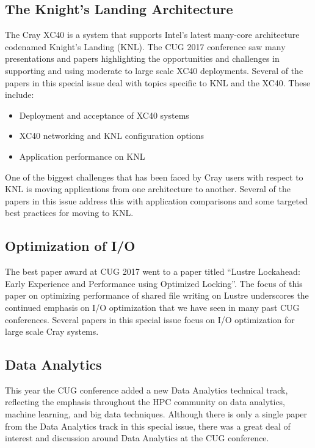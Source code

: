 \documentclass[AMA,LATO1COL,demo]{WileyNJD-v2}
\begin{document}
\subsection{The Knight's Landing Architecture}\label{sec:knl}

The Cray XC40 is a system that supports Intel's latest many-core architecture codenamed
Knight's Landing (KNL). The CUG 2017 conference saw many presentations and papers
highlighting the opportunities and challenges in supporting and using moderate to large
scale XC40 deployments. Several of the papers in this special issue deal with topics
specific to KNL and the XC40. These include: \begin{itemize} \item Deployment and
acceptance of XC40 systems \item XC40 networking and KNL configuration options \item
Application performance on KNL \end{itemize} One of the biggest challenges that has been
faced by Cray users with respect to KNL is moving applications from one architecture to
another. Several of the papers in this issue address this with application comparisons and
some targeted best practices for moving to KNL.

\subsection{Optimization of I/O}\label{sec:io}

The best paper award at CUG 2017 went to a paper titled ``Lustre Lockahead: Early
Experience and Performance using Optimized Locking''. The focus of this paper on
optimizing performance of shared file writing on Lustre underscores the continued emphasis
on I/O optimization that we have seen in many past CUG conferences. Several papers in this
special issue focus on I/O optimization for large scale Cray systems.

\subsection{Data Analytics}\label{sec:data}

This year the CUG conference added a new Data Analytics technical track, reflecting the
emphasis throughout the HPC community on data analytics, machine learning, and big data
techniques. Although there is only a single paper from the Data Analytics track in this
special issue, there was a great deal of interest and discussion around Data Analytics at
the CUG conference.
\end{document}
